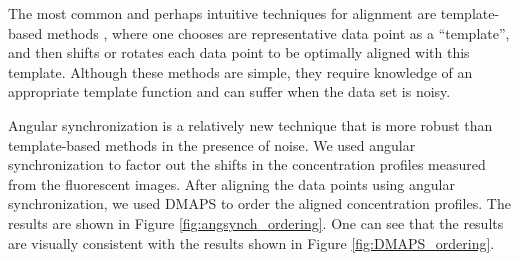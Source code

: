 \documentclass[10pt]{article}
\begin{document}
The most common and perhaps intuitive techniques for alignment are template-based methods \cite{ahuja2007template}, where one chooses are representative data point as a ``template'', and then shifts or rotates each data point to be optimally aligned with this template.
%
Although these methods are simple, they require knowledge of an appropriate template function and can suffer when the data set is noisy.

Angular synchronization \cite{singer2011angular} is a relatively new technique that is more robust than template-based methods in the presence of noise.
%
We used angular synchronization to factor out the shifts in the concentration profiles measured from the fluorescent images.
%
After aligning the data points using angular synchronization, we used DMAPS to order the aligned concentration profiles.
%
The results are shown in Figure \ref{fig:angsynch_ordering}.
%
One can see that the results are visually consistent with the results shown in Figure \ref{fig:DMAPS_ordering}. 
\end{document}
